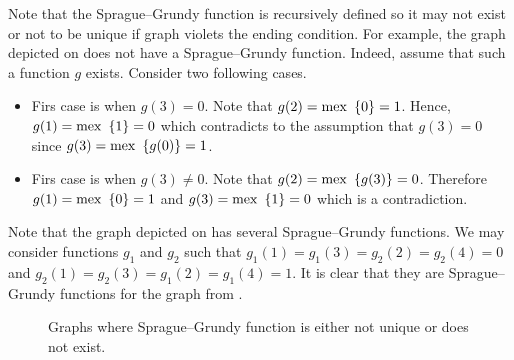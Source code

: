 Note that the Sprague--Grundy function is recursively defined so it may
not exist or not to be unique if graph violets the ending condition.
For example, the graph depicted on 
does not have a Sprague--Grundy function.
Indeed, assume that such a function $g$ exists. Consider two following cases.
\begin{itemize}
    \item Firs case is when $g(3) = 0$. Note that $g(2) = \mex \set{0} = 1$.
        Hence, $g(1) = \mex \set{1} = 0$ which contradicts to the assumption
        that $g(3) = 0$ since $g(3) = \mex \set{g(0)} = 1$.
    \item Firs case is when $g(3) \neq 0$. Note that $g(2) = \mex \set{g(3)} = 0$.
        Therefore $g(1) = \mex \set{0} = 1$ and $g(3) = \mex \set{1} = 0$ which
        is a contradiction.
\end{itemize}

Note that the graph depicted on  has
several Sprague--Grundy functions. We may consider functions $g_1$ and $g_2$
such that $g_1(1) = g_1(3) = g_2(2) = g_2(4) = 0$ and
$g_2(1) = g_2(3) = g_1(2) = g_1(4) = 1$. It is clear that they are
Sprague--Grundy functions for the graph from
.

\begin{figure}
    \centering
    \qquad
    \caption{Graphs where Sprague--Grundy function is either not unique or does
      not exist.}
    \vskip 10pt
\end{figure}

